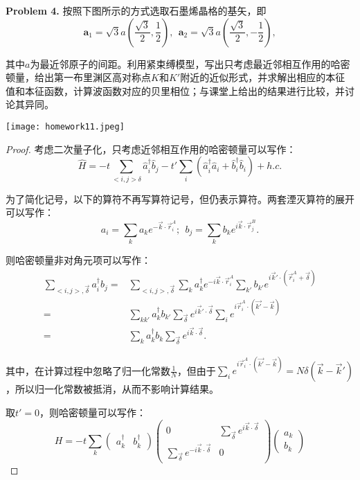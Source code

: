 \documentclass[reqno,a4paper,12pt]{amsart}
\begin{document}
\textbf{Problem 4.} 按照下图所示的方式选取石墨烯晶格的基矢，即
\[
	\mathbf{a}_1 = \sqrt{3}a\left( \frac{\sqrt{3}}{2}, \frac{1}{2} \right), \ \ \mathbf{a}_2 = \sqrt{3}a\left( \frac{\sqrt{3}}{2}, -\frac{1}{2} \right),
\]

其中$a$为最近邻原子的间距。利用紧束缚模型，写出只考虑最近邻相互作用的哈密顿量，给出第一布里渊区高对称点$K$和$K'$附近的近似形式，并求解出相应的本征值和本征函数，计算波函数对应的贝里相位；与课堂上给出的结果进行比较，并讨论其异同。

\begin{center}
	\texttt{[image: homework11.jpeg]}
\end{center}


\begin{proof}
考虑二次量子化，只考虑近邻相互作用的哈密顿量可以写作：
\[
	\hat{H} = -t\sum_{<i, j> \delta} \hat{a}_i^\dagger \hat{b}_j - t' \sum_i (\hat{a}_i^\dagger \hat{a}_i + \hat{b}_i^\dagger \hat{b}_i) + h.c.
\]

为了简化记号，以下的算符不再写算符记号$\hat{}$，但仍表示算符。两套湮灭算符的展开可以写作：
\[
	a_i = \sum_k a_k e^{-\vec{k} \cdot \vec{r}_i^A}; \ \ b_j = \sum_k b_k e^{i\vec{k} \cdot \vec{r}_j^B}.
\]

则哈密顿量非对角元项可以写作：
\begin{align*}
	\sum_{<i, j>, \vec{\delta}} a^\dagger_i b_j =& \sum_{<i, j>, \vec{\delta}} \sum_k a^\dagger_k e^{-i\vec{k} \cdot \vec{r}_i^A} \sum_{k'} b_{k'} e^{i\vec{k}' \cdot (\vec{r}_i^A + \vec{\delta})} \\
	=& \sum_{kk'} a_k^\dagger b_{k'} \sum_{\vec{\delta}} e^{i\vec{k}' \cdot \vec{\delta}} \sum_i e^{i\vec{r}_i^A \cdot (\vec{k'}-\vec{k})} \\
	=& \sum_{k} a^\dagger_k b_k \sum_{\vec{\delta}} e^{i\vec{k} \cdot \vec{\delta}}.
\end{align*}

其中，在计算过程中忽略了归一化常数$\frac{1}{N}$，但由于$\sum_i e^{i\vec{r}_i^A \cdot (\vec{k'}-\vec{k})} = N \delta(\vec{k} - \vec{k}')$，所以归一化常数被抵消，从而不影响计算结果。

取$t' = 0$，则哈密顿量可以写作：
\[
	H = -t\sum_k \left( \begin{matrix}
		a_k^\dagger & b_k^\dagger
	\end{matrix} \right) \left( \begin{matrix}
		0 & \sum_{\vec{\delta}} e^{i\vec{k} \cdot \vec{\delta}} \\
		\sum_{\vec{\delta}} e^{-i\vec{k} \cdot \vec{\delta}} & 0
	\end{matrix} \right) \left( \begin{matrix}
		a_k \\
		b_k
	\end{matrix} \right)
\]


\end{proof}
\end{document}
